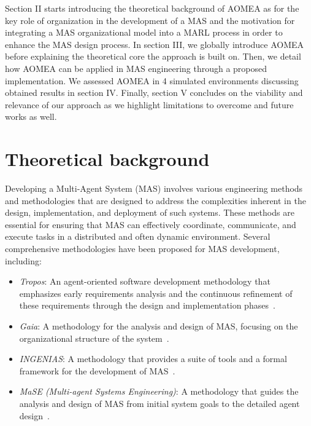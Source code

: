 \documentclass[runningheads]{llncs}
\begin{document}
Section II starts introducing the theoretical background of AOMEA as for the key role of organization in the development of a MAS and the motivation for integrating a MAS organizational model into a MARL process in order to enhance the MAS design process. In section III, we globally introduce AOMEA before explaining the theoretical core the approach is built on. Then, we detail how AOMEA can be applied in MAS engineering through a proposed implementation. We assessed AOMEA in 4 simulated environments discussing obtained results in section IV. Finally, section V concludes on the viability and relevance of our approach as we highlight limitations to overcome and future works as well.


\section{Theoretical background}







Developing a Multi-Agent System (MAS) involves various engineering methods and methodologies that are designed to address the complexities inherent in the design, implementation, and deployment of such systems. These methods are essential for ensuring that MAS can effectively coordinate, communicate, and execute tasks in a distributed and often dynamic environment.
Several comprehensive methodologies have been proposed for MAS development, including:

\begin{itemize}
    \item \emph{Tropos}: An agent-oriented software development methodology that emphasizes early requirements analysis and the continuous refinement of these requirements through the design and implementation phases~\cite{Bresciani2004}.
    \item \emph{Gaia}: A methodology for the analysis and design of MAS, focusing on the organizational structure of the system~\cite{Zambonelli2003}.
    \item \emph{INGENIAS}: A methodology that provides a suite of tools and a formal framework for the development of MAS~\cite{Pavon2003}.
    \item \emph{MaSE (Multi-agent Systems Engineering)}: A methodology that guides the analysis and design of MAS from initial system goals to the detailed agent design~\cite{Scott2004}.
\end{itemize}
\end{document}

